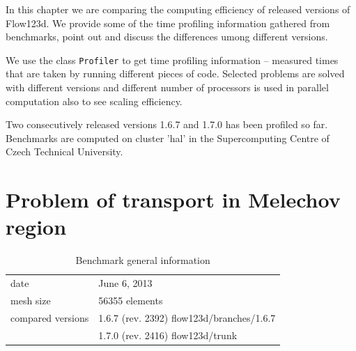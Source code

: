%
%
%
%
%
%
%
%


In this chapter we are comparing the computing efficiency of released versions of Flow123d. We provide some 
of the time profiling information gathered from benchmarks, point out and discuss the differences umong different 
versions.

We use the class \verb'Profiler' to get time profiling information -- measured times that are taken by running different 
pieces of code. Selected problems are solved with different versions and different number 
of processors is used in parallel computation also to see scaling efficiency.

Two consecutively released versions 1.6.7 and 1.7.0 has been profiled so far. 
Benchmarks are computed on cluster 'hal' in the Supercomputing Centre of Czech Technical University.


\section{Problem of transport in Melechov region}

\begin{table}[!htb]
\centering
\begin{tabular}{ll}
date & June 6, 2013 \\
mesh size & 56355 elements \\
compared versions & 1.6.7 (rev. 2392) flow123d/branches/1.6.7 \\
                  & 1.7.0 (rev. 2416) flow123d/trunk
\end{tabular}
\caption{Benchmark general information}
\label{tab:bench1}
\end{table}


